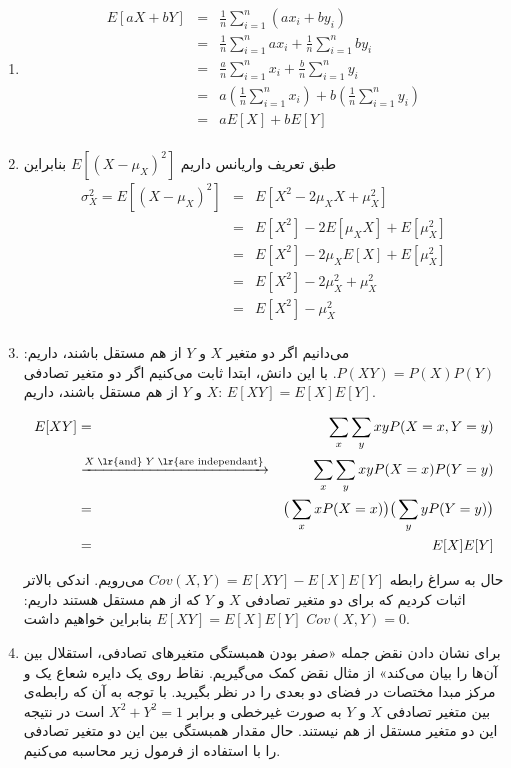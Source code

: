 \documentclass[14pt,a4]{article}
\begin{document}
\begin{enumerate}[label=\alph* )]
    \item
    \begin{eqnarray*}
        E[aX+bY] & = & \frac{1}{n}\sum_{i=1}^{n} (ax_i + by_i) \\
        & = & \frac{1}{n}\sum_{i=1}^{n} ax_i + \frac{1}{n}\sum_{i=1}^{n} by_i \\
        & = & \frac{a}{n}\sum_{i=1}^{n} x_i + \frac{b}{n}\sum_{i=1}^{n} y_i \\
        & = & a(\frac{1}{n}\sum_{i=1}^{n} x_i) + b(\frac{1}{n}\sum_{i=1}^{n} y_i) \\
        & = & a E[X] + b E[Y] \\
    \end{eqnarray*}
    \item طبق تعریف واریانس داریم $E[(X-\mu_X)^2]$ بنابراین
    \begin{eqnarray*}
        \sigma_X^2 = E[(X-\mu_X)^2] & = & E[X^2 -2\mu_XX + \mu_X^2] \\
        & = & E[X^2] -2 E[\mu_XX] + E[\mu_X^2] \\
        & = & E[X^2] -2\mu_XE[X] + E[\mu_X^2] \\
        & = & E[X^2] -2\mu_X^2 + \mu_X^2 \\
        & = & E[X^2] - \mu_X^2 \\
    \end{eqnarray*}
    \item  می‌دانیم اگر دو متغیر $X$ و $Y$ از هم مستقل باشند، داریم:
    \linebreak
    $P(XY) = P(X)P(Y)$. با این دانش، ابتدا ثابت می‌کنیم اگر دو متغیر تصادفی $X$ و $Y$ از هم مستقل باشند، داریم:
    $E[XY] = E[X]E[Y]$.

    \begin{eqnarray*}
        E[XY] & = & \sum_{x}\sum_{y} xy P(X=x,Y=y) \\
        &\xrightarrow{X \; \text{\lr{and}} \;Y \;\text{\lr{are independant}}}& \sum_{x}\sum_{y} xy P(X=x)P(Y=y) \\
        &=& \big(\sum_{x}x P(X=x)\big)\big(\sum_{y} y P(Y=y)\big) \\
        &=& E[X]E[Y]
    \end{eqnarray*}

    حال به سراغ رابطه‌ $Cov(X,Y) = E[XY] - E[X]E[Y]$ می‌رویم. اندکی بالاتر اثبات کردیم که برای دو متغیر تصادفی
    $X$ و $Y$ که از هم مستقل هستند داریم: $E[XY] = E[X]E[Y]$ بنابراین خواهیم داشت $Cov(X,Y) = 0$.

    \item برای نشان دادن نقض جمله «صفر بودن همبستگی متغیر‌های تصادفی، استقلال بین آن‌ها را بیان می‌کند» از مثال
    نقض کمک می‌گیریم. نقاط روی یک دایره شعاع یک و مرکز مبدا مختصات در فضای دو بعدی را در نظر بگیرید.
    با توجه به آن که رابطه‌ی بین متغیر تصادفی $X$ و $Y$ به صورت غیرخطی و برابر $X^2 + Y^2 = 1$ است در
    نتیجه این دو متغیر مستقل از هم نیستند. حال مقدار همبستگی بین این دو متغیر تصادفی را با استفاده از
    فرمول زیر محاسبه می‌کنیم.


\end{enumerate}
\end{document}
